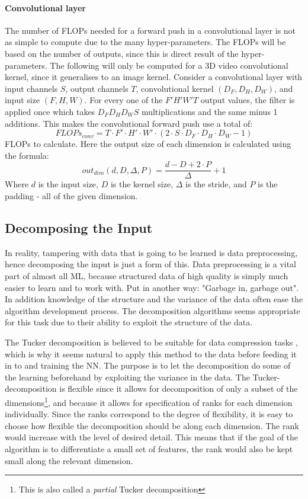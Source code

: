 \paragraph{Convolutional layer}
The number of FLOPs needed for a forward push in a convolutional layer is not as simple to compute due to the many hyper-parameters. The FLOPs will be based on the number of outputs, since this is direct result of the hyper-parameters. The following will only be computed for a 3D video convolutional kernel, since it generalises to an image kernel. Consider a convolutional layer with input channels $S$, output channels $T$, convolutional kernel $(D_F, D_H, D_W)$, and input size $(F, H, W)$. For every one of the $F' H' W' T$ output values, the filter is applied once which takes $D_F D_H D_W S$ multiplications and the same minus 1 additions. This makes the convolutional forward push use a total of:
\begin{equation}
    FLOPs_{conv} = T\cdot F'\cdot H'\cdot W'\cdot (2\cdot S \cdot D_F\cdot D_H\cdot D_W - 1)
\end{equation}
FLOPs to calculate. Here the output size of each dimension is calculated using the formula:
\begin{equation}
    out_{dim}(d, D, \Delta, P) = \frac{d - D + 2\cdot P}{\Delta} + 1
\end{equation}
Where $d$ is the input size, $D$ is the kernel size, $\Delta$ is the stride, and $P$ is the padding - all of the given dimension.

\subsection{Decomposing the Input}
In reality, tampering with data that is going to be learned is data preprocessing, hence decomposing the input is just a form of this. Data preprocessing is a vital part of almost all ML, because structured data of high quality is simply much easier to learn and to work with. Put in another way: "Garbage in, garbage out". In addition knowledge of the structure and the variance of the data often ease the algorithm development process. The decomposition algorithms seems appropriate for this task due to their ability to exploit the structure of the data.

The Tucker decomposition is believed to be suitable for data compression tasks \cite{Mørup2011}, which is why it seems natural to apply this method to the data before feeding it in to and training the NN. The purpose is to let the decomposition do some of the learning beforehand by exploiting the variance in the data. The Tucker-decomposition is flexible since it allows for decomposition of only a subset of the dimensions\footnote{This is also called a \textit{partial} Tucker decomposition}, and because it allows for specification of ranks for each dimension individually. Since the ranks correspond to the degree of flexibility, it is easy to choose how flexible the decomposition should be along each dimension. The rank would increase with the level of desired detail. This means that if the goal of the algorithm is to differentiate a small set of features, the rank would also be kept small along the relevant dimension.

